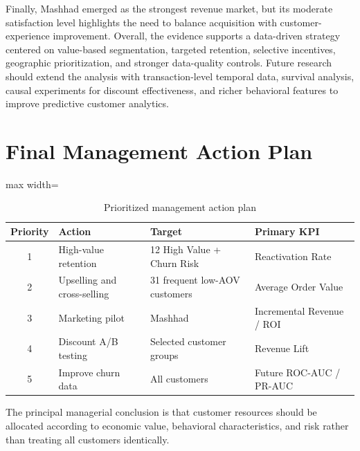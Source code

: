 \documentclass[11pt,a4paper]{article}
\begin{document}
Finally, Mashhad emerged as the strongest revenue market, but its
moderate satisfaction level highlights the need to balance acquisition
with customer-experience improvement. Overall, the evidence supports a
data-driven strategy centered on value-based segmentation, targeted
retention, selective incentives, geographic prioritization, and stronger
data-quality controls. Future research should extend the analysis with
transaction-level temporal data, survival analysis, causal experiments
for discount effectiveness, and richer behavioral features to improve
predictive customer analytics.


\section{Final Management Action Plan}

\begin{table}[H]
\centering
\caption{Prioritized management action plan}
\label{tab:action_plan}
\begin{adjustbox}{max width=\textwidth}
\begin{tabular}{clll}
\toprule
\textbf{Priority} &
\textbf{Action} &
\textbf{Target} &
\textbf{Primary KPI}\\
\midrule
1 &
High-value retention &
12 High Value + Churn Risk &
Reactivation Rate\\

2 &
Upselling and cross-selling &
31 frequent low-AOV customers &
Average Order Value\\

3 &
Marketing pilot &
Mashhad &
Incremental Revenue / ROI\\

4 &
Discount A/B testing &
Selected customer groups &
Revenue Lift\\

5 &
Improve churn data &
All customers &
Future ROC-AUC / PR-AUC\\
\bottomrule
\end{tabular}
\end{adjustbox}
\end{table}

The principal managerial conclusion is that customer resources should be allocated according to economic value, behavioral characteristics, and risk rather than treating all customers identically.

\end{document}
